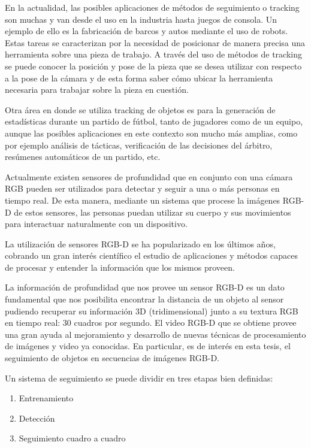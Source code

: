 
En la actualidad, las posibles aplicaciones de métodos de seguimiento o tracking son muchas y van desde el uso en la industria hasta juegos de consola. Un ejemplo de ello es la fabricación de barcos y autos mediante el uso de robots. Estas tareas se caracterizan por la necesidad de posicionar de manera precisa una herramienta sobre una pieza de trabajo. A través del uso de métodos de tracking se puede conocer la posición y pose de la pieza que se desea utilizar con respecto a la pose de la cámara y de esta forma saber cómo ubicar la herramienta necesaria para trabajar sobre la pieza en cuestión.

Otra área en donde se utiliza tracking de objetos es para la generación de estadísticas durante un partido de fútbol, tanto de jugadores como de un equipo, aunque las posibles aplicaciones en este contexto son mucho más amplias, como por ejemplo análisis de tácticas, verificación de las decisiones del árbitro, resúmenes automáticos de un partido, etc.

Actualmente existen sensores de profundidad que en conjunto con una cámara RGB pueden ser utilizados para detectar y seguir a una o más personas en tiempo real. De esta manera, mediante un sistema que procese la imágenes RGB-D de estos sensores, las personas puedan utilizar su cuerpo y sus movimientos para interactuar naturalmente con un dispositivo.

La utilización de sensores RGB-D se ha popularizado en los últimos años, cobrando un gran interés científico el estudio de aplicaciones y métodos capaces de procesar y entender la información que los mismos proveen.

La información de profundidad que nos provee un sensor RGB-D es un dato fundamental que nos posibilita encontrar la distancia de un objeto al sensor pudiendo recuperar su información 3D (tridimensional) junto a su textura RGB en tiempo real: 30 cuadros por segundo.
El video RGB-D que se obtiene provee una gran ayuda al mejoramiento y desarrollo de nuevas técnicas de procesamiento de imágenes y video ya conocidas. En particular, es de interés en esta tesis, el seguimiento de objetos en secuencias de imágenes RGB-D.

Un sistema de seguimiento se puede dividir en tres etapas bien definidas:
\begin{enumerate}
 \item Entrenamiento
 \item Detección
 \item Seguimiento cuadro a cuadro
\end{enumerate}

